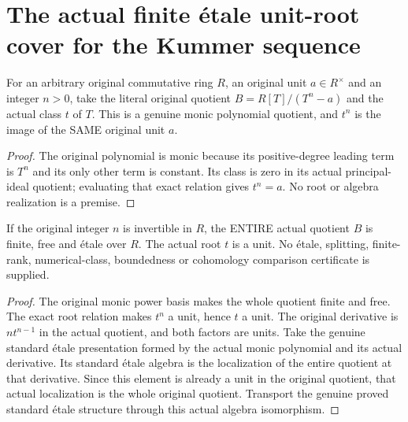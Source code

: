 \section{The actual finite étale unit-root cover for the Kummer sequence}
\begin{definition}\label{def:actual-kummer-unit-root-algebra}
\leanok
For an arbitrary original commutative ring $R$, an original unit $a\in R^\times$ and an integer $n>0$, take the literal original quotient $B=R[T]/(T^n-a)$ and the actual class $t$ of $T$. This is a genuine monic polynomial quotient, and $t^n$ is the image of the SAME original unit $a$.
\end{definition}
\begin{proof}
The original polynomial is monic because its positive-degree leading term is $T^n$ and its only other term is constant. Its class is zero in its actual principal-ideal quotient; evaluating that exact relation gives $t^n=a$. No root or algebra realization is a premise.
\end{proof}
\begin{theorem}\label{thm:actual-kummer-unit-root-finite-etale}
\leanok
{}
If the original integer $n$ is invertible in $R$, the ENTIRE actual quotient $B$ is finite, free and étale over $R$. The actual root $t$ is a unit. No étale, splitting, finite-rank, numerical-class, boundedness or cohomology comparison certificate is supplied.
\end{theorem}
\begin{proof}
The original monic power basis makes the whole quotient finite and free. The exact root relation makes $t^n$ a unit, hence $t$ a unit. The original derivative is $n t^{n-1}$ in the actual quotient, and both factors are units. Take the genuine standard étale presentation formed by the actual monic polynomial and its actual derivative. Its standard étale algebra is the localization of the entire quotient at that derivative. Since this element is already a unit in the original quotient, that actual localization is the whole original quotient. Transport the genuine proved standard étale structure through this actual algebra isomorphism.
\end{proof}
